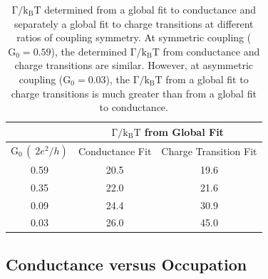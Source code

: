 \begin{table}[H] 
\centering
\begin{tabular}{|c|c|c|}
\hline
\multicolumn{1}{|c|}{} & \multicolumn{2}{c|}{$\mathrm{\Gamma/k_BT}$ from  Global Fit}\\
\hline
 $\mathrm{G_0}\,(\qty{}{2e^2/h})$ & Conductance Fit &  Charge Transition Fit \\
\hline
0.59 & 20.5 & 19.6 \\
0.35 & 22.0 & 21.6 \\
0.09 & 24.4 & 30.9\\
0.03 & 26.0 & 45.0\\
\hline
\end{tabular}
 \caption[$\mathrm{\Gamma/k_BT}$ From Conductance and Charge Transition Global Fits]{\label{tab:sym_coupling_gf} $\mathrm{\Gamma/k_BT}$ determined from a global fit to conductance and separately a global fit to charge transitions at different ratios of coupling symmetry. At symmetric coupling ($\mathrm{G_0}=0.59$), the determined $\mathrm{\Gamma/k_BT}$ from conductance and charge transitions are similar. However, at asymmetric coupling ($\mathrm{G_0}=0.03$), the $\mathrm{\Gamma/k_BT}$ from a global fit to charge transitions is much greater than from a global fit to conductance.}
\end{table}

\subsection{Conductance versus Occupation}



